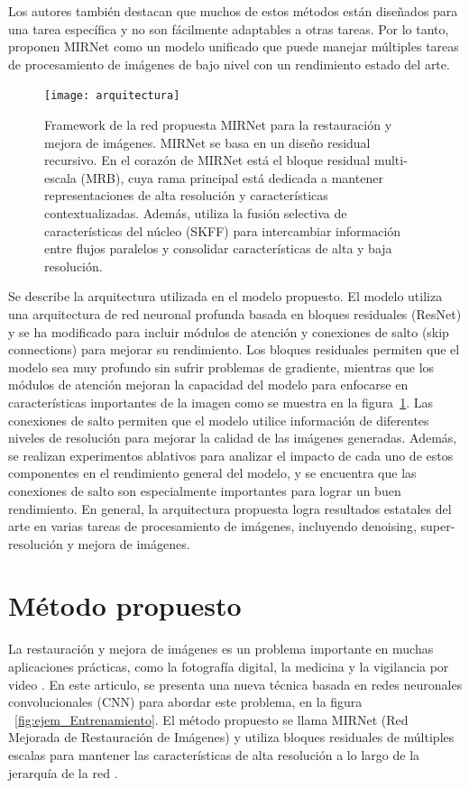 \documentclass[a4paper,
               ]{jacow}
\begin{document}
Los autores también destacan que muchos de estos métodos están diseñados para una tarea específica y no son fácilmente adaptables a otras tareas. Por lo tanto, proponen MIRNet como un modelo unificado que puede manejar múltiples tareas de procesamiento de imágenes de bajo nivel con un rendimiento estado del arte.

\begin{figure}[!h]
    \centering
    \texttt{[image: arquitectura]}
    \caption{Framework de la red propuesta MIRNet para la restauración y mejora de imágenes. MIRNet se basa en un diseño residual recursivo. En el corazón de MIRNet está el bloque residual multi-escala (MRB), cuya rama principal está dedicada a mantener representaciones de alta resolución y características contextualizadas. Además, utiliza la fusión selectiva de características del núcleo (SKFF) para intercambiar información entre flujos paralelos y consolidar características de alta y baja resolución.}
    \label{fig:arquitectura}
\end{figure}
Se describe la arquitectura utilizada en el modelo propuesto. El modelo utiliza una arquitectura de red neuronal profunda basada en bloques residuales (ResNet) y se ha modificado para incluir módulos de atención y conexiones de salto (skip connections) para mejorar su rendimiento. Los bloques residuales permiten que el modelo sea muy profundo sin sufrir problemas de gradiente, mientras que los módulos de atención mejoran la capacidad del modelo para enfocarse en características importantes de la imagen como se muestra en la figura~\ref{fig:arquitectura}. Las conexiones de salto permiten que el modelo utilice información de diferentes niveles de resolución para mejorar la calidad de las imágenes generadas. Además, se realizan experimentos ablativos para analizar el impacto de cada uno de estos componentes en el rendimiento general del modelo, y se encuentra que las conexiones de salto son especialmente importantes para lograr un buen rendimiento. En general, la arquitectura propuesta logra resultados estatales del arte en varias tareas de procesamiento de imágenes, incluyendo denoising, super-resolución y mejora de imágenes.

\section{Método propuesto}
La restauración y mejora de imágenes es un problema importante en muchas aplicaciones prácticas, como la fotografía digital, la medicina y la vigilancia por video \cite{zhang2017beyond}. En este articulo, se presenta una nueva técnica basada en redes neuronales convolucionales (CNN) para abordar este problema, en la figura ~\ref{fig:ejem_Entrenamiento}. El método propuesto se llama MIRNet (Red Mejorada de Restauración de Imágenes) y utiliza bloques residuales de múltiples escalas para mantener las características de alta resolución a lo largo de la jerarquía de la red \cite{tian2020learning}.
\end{document}
